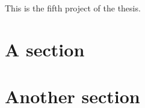 This is the fifth project of the thesis.

\lipsum[1]

\section{A section}
\lipsum[2]

\section{Another section}
\lipsum[3]